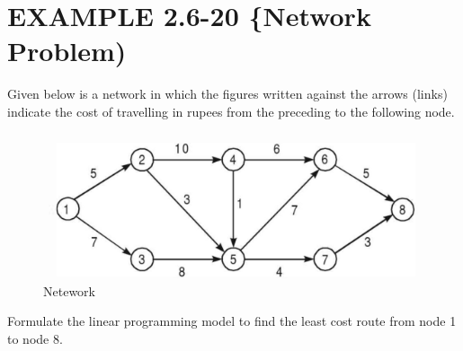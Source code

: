 \hypertarget{example-2.6-20-network-problem}{%
\section{EXAMPLE 2.6-20 \{Network
Problem)}\label{example-2.6-20-network-problem}}

Given below is a network in which the figures written against the arrows
(links) indicate the cost of travelling in rupees from the preceding to
the following node.

\begin{figure}
\centering
\includegraphics{figs/example_2-06-20.png}
\caption{Netework}
\end{figure}

Formulate the linear programming model to find the least cost route from
node 1 to node 8.
